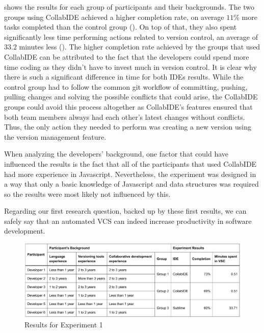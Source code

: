  shows the results for each group of participants and their 
backgrounds. The two groups using CollabIDE achieved a higher completion rate, on average $11\%$ 
more tasks completed than the control group (). On top of that, they 
also spent significantly less time performing actions related to version control, an average of $33.2$  
minutes less (). The higher completion rate achieved by the groups 
that used CollabIDE can be attributed to the fact that the developers could spend more time coding as 
they didn't have to invest much in version control. It is clear why there is such a significant difference in 
time for both IDEs results. While the control group had to follow the common git workflow of committing, 
pushing, pulling changes and solving the possible conflicts that could arise, the CollabIDE groups could 
avoid this process altogether as CollabIDE’s features ensured that both team members always had 
each other's latest changes without conflicts. Thus, the only action they needed to perform was 
creating a new version using the version management feature.

When analyzing the developers' background, one factor that could have influenced the results is the 
fact that all of the participants that used CollabIDE had more experience in Javascript. Nevertheless, 
the experiment was designed in a way that only a basic knowledge of Javascript and data structures 
was required so the results were most likely not influenced by this.

Regarding our first research question, backed up by these first results, we can safely say that an 
automated \ac{VCS} can indeed increase productivity in software development.

\begin{figure}[htbp]
  \centering
  \includegraphics[width=1\textwidth]{img/resultsTableCollaborative}
  \caption{Results for Experiment 1}
  \label{fig:resultsTableCollaborative}
\end{figure}

